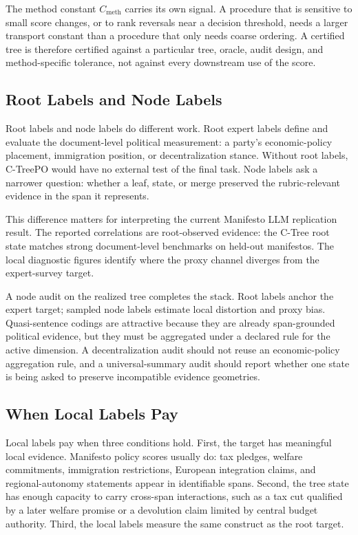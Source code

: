 The method constant \(C_{\mathrm{meth}}\) carries its own signal. A
procedure that is sensitive to small score changes, or to rank
reversals near a decision threshold, needs a larger transport
constant than a procedure that only needs coarse ordering. A
certified tree is therefore certified against a particular tree,
oracle, audit design, and method-specific tolerance, not against
every downstream use of the score.

\subsection{Root Labels and Node Labels}

Root labels and node labels do different work. Root expert labels define and
evaluate the document-level political measurement: a party's economic-policy
placement, immigration position, or decentralization stance. Without
root labels, C-TreePO would have no external test of the final task.
Node labels ask a narrower question: whether a leaf, state, or merge preserved the
rubric-relevant evidence in the span it represents.

This difference matters for interpreting the current Manifesto
LLM replication result. The reported correlations are root-observed evidence: the
C-Tree root state matches strong document-level benchmarks on
held-out manifestos. The local diagnostic figures identify where the
proxy channel diverges from the expert-survey target.

A node audit on the realized tree completes the stack. Root labels
anchor the expert target; sampled node labels estimate local
distortion and proxy bias. Quasi-sentence codings are attractive
because they are already span-grounded political evidence, but they
must be aggregated under a declared rule for the active dimension. A
decentralization audit should not reuse an economic-policy
aggregation rule, and a universal-summary audit should report whether
one state is being asked to preserve incompatible evidence
geometries.

\subsection{When Local Labels Pay}

Local labels pay when three conditions hold. First, the target has meaningful
local evidence. Manifesto policy scores usually do: tax pledges, welfare
commitments, immigration restrictions, European integration claims, and
regional-autonomy statements appear in identifiable spans. Second, the tree
state has enough capacity to carry cross-span interactions, such as a tax cut
qualified by a later welfare promise or a devolution claim limited by central
budget authority. Third, the local labels measure the same construct as the
root target.

